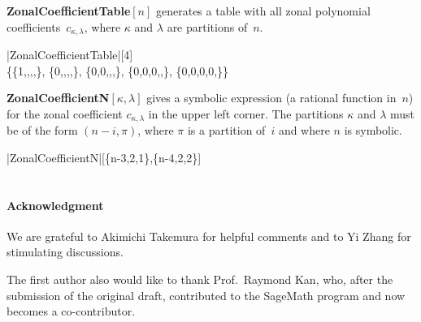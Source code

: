 \documentclass{mathincs}
\numberwithin{equation}{section}
\numberwithin{figure}{section}
\theoremstyle{plain}
\theoremstyle{definition}
\theoremstyle{remark}
\theoremstyle{plain}
\theoremstyle{definition}
\theoremstyle{plain}
\theoremstyle{plain}
\begin{document}
\noindent\textbf{ZonalCoefficientTable}$[n]$
generates a table with all zonal polynomial coefficients~$c_{\kappa,\lambda}$,
where $\kappa$ and $\lambda$ are partitions of~$n$.
\begin{mma}
  \In |ZonalCoefficientTable|[4] \\ %
  \Out \Bigl\{\Bigl\{1,,,,\Bigr\},
    \Bigl\{0,,,,\Bigr\},
    \Bigl\{0,0,,,\Bigr\},
    \Bigl\{0,0,0,,\Bigr\},
    \Bigl\{0,0,0,0,\Bigr\}\Bigr\} \kern-8pt \\
\end{mma}
\bigskip

\noindent\textbf{ZonalCoefficientN}$[\kappa, \lambda]$
gives a symbolic expression (a rational function in~$n$) for the
zonal coefficient $c_{\kappa,\lambda}$ in the upper left corner.
The partitions $\kappa$ and $\lambda$ must be of the form $(n-i,\pi)$,
where $\pi$ is a partition of~$i$ and where $n$ is symbolic.
\begin{mma}
  \In |ZonalCoefficientN|[\{n-3,2,1\},\{n-4,2,2\}] \\
  \Out {} \\
\end{mma}
\bigskip

\paragraph*{Acknowledgment}
We are grateful to Akimichi Takemura for helpful comments and to Yi Zhang for
stimulating discussions.

The first author also would like to thank Prof.~Raymond Kan, who, after the submission of the original draft, contributed to the SageMath program and now becomes a co-contributor. 





\end{document}
